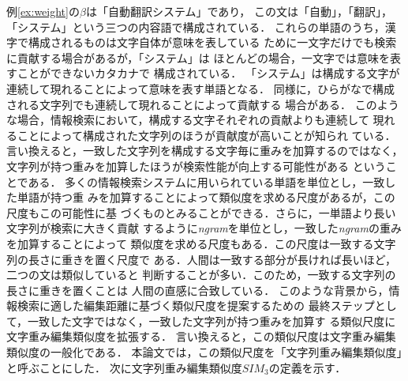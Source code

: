 例\ref{ex:weight}の$\beta$は「自動翻訳システム」であり，
この文は「自動」，「翻訳」，「システム」という三つの内容語で構成されている．
これらの単語のうち，漢字で構成されるものは文字自体が意味を表している
ために一文字だけでも検索に貢献する場合があるが，「システム」は
ほとんどの場合，一文字では意味を表すことができないカタカナで
構成されている．
「システム」は構成する文字が連続して現れることによって意味を表す単語となる．
同様に，ひらがなで構成される文字列でも連続して現れることによって貢献する
場合がある．
このような場合，情報検索において，構成する文字それぞれの貢献よりも連続して
現れることによって構成された文字列のほうが貢献度が高いことが知られ
ている．
言い換えると，一致した文字列を構成する文字毎に重みを加算するのではなく，
文字列が持つ重みを加算したほうが検索性能が向上する可能性がある
ということである．
多くの情報検索システムに用いられている単語を単位とし，一致した単語が持つ重
みを加算することによって類似度を求める尺度があるが，この尺度もこの可能性に基
づくものとみることができる．さらに，一単語より長い文字列が検索に大きく貢献
するように{\it ngram}を単位とし，一致した{\it ngram}の重みを加算することによって
類似度を求める尺度もある．この尺度は一致する文字列の長さに重きを置く尺度で
ある．人間は一致する部分が長ければ長いほど，二つの文は類似していると
判断することが多い．このため，一致する文字列の長さに重きを置くことは
人間の直感に合致している．
このような背景から，情報検索に適した編集距離に基づく類似尺度を提案するための
最終ステップとして，一致した文字ではなく，一致した文字列が持つ重みを加算す
る類似尺度に文字重み編集類似度を拡張する．
言い換えると，この類似尺度は文字重み編集類似度の一般化である．
本論文では，この類似尺度を「文字列重み編集類似度」と呼ぶことにした．
次に文字列重み編集類似度$SIM_3$の定義を示す．
